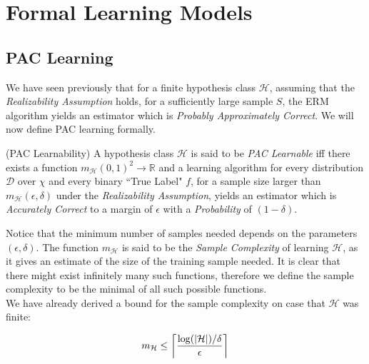\documentclass[11pt,oneside,onemany]{book} %
\DeclarePairedDelimiter{\ceil}{\lceil}{\rceil}
\begin{document}


\chapter{Formal Learning Models}

\section{PAC Learning}
We have seen previously that for a finite hypothesis class $\mathcal{H}$, assuming that the \emph{Realizability Assumption} holds, for a sufficiently large sample $S$, the ERM algorithm yields an estimator which is \emph{Probably Approximately Correct}. We will now define PAC learning formally.

\begin{definition}
(PAC Learnability) A hypothesis class $\mathcal{H}$ is said to be \emph{PAC Learnable} iff there exists a function $m_\mathcal{H}(0,1)^2\rightarrow\mathbb{R}$ and a learning algorithm for every distribution $\mathcal{D}$ over $\chi$ and every binary ``True Label" $f$, for a sample size larger than $m_\mathcal{H}(\epsilon,\delta)$ under the \emph{Realizability Assumption}, yields an estimator which is \emph{Accurately Correct} to a margin of $\epsilon$ with a \emph{Probability} of $(1-\delta)$.
\end{definition}

Notice that the minimum number of samples needed depends on the parameters $(\epsilon, \delta)$. The function $m_\mathcal{H}$ is said to be the \emph{Sample Complexity} of learning $\mathcal{H}$, as it gives an estimate of the size of the training sample needed. It is clear that there might exist infinitely many such functions, therefore we define the sample complexity to be the minimal of all such possible functions.\\

We have already derived a bound for the sample complexity on case that $\mathcal{H}$ was finite:

$$m_\mathcal{H} \leq \ceil*{\frac{\log(|\mathcal{H}|)/\delta}{\epsilon}}$$
\end{document}
